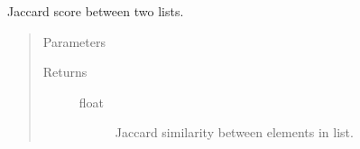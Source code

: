 \documentclass[letterpaper,10pt,english]{sphinxmanual}
\begin{document}
\begin{fulllineitems}
\label{\detokenize{index:methylnet.interpretation_classes.jaccard_similarity}}
Jaccard score between two lists.
\begin{quote}\begin{description}
\item[{Parameters}] \leavevmode\begin{description}
\item[{}] \leavevmode
\item[{}] \leavevmode
\end{description}

\item[{Returns}] \leavevmode\begin{description}
\item[{float}] \leavevmode
Jaccard similarity between elements in list.

\end{description}

\end{description}\end{quote}

\end{fulllineitems}

\end{document}
